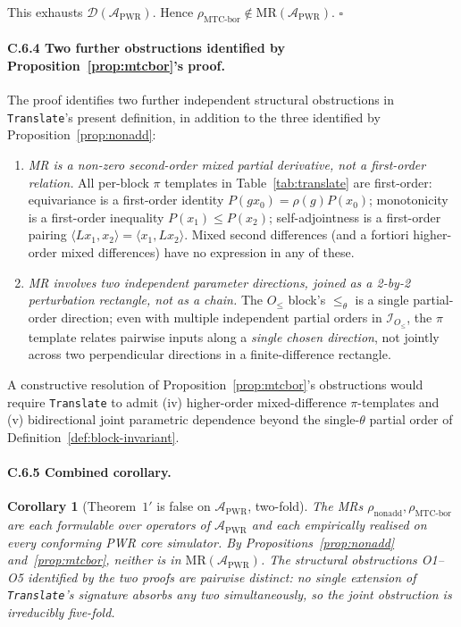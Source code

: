 \documentclass[manuscript]{acmart}
\newtheorem*{corollary*}{Corollary}
\begin{document}
This exhausts $\mathcal{D}(\mathcal{A}_{\mathrm{PWR}})$. Hence $\rho_{\mathrm{MTC\text{-}bor}} \notin \mathrm{MR}(\mathcal{A}_{\mathrm{PWR}})$. \hfill$\square$

\paragraph{C.6.4 Two further obstructions identified by Proposition~\ref{prop:mtcbor}'s proof.}
The proof identifies two further independent structural obstructions in \texttt{Translate}'s present definition, in addition to the three identified by Proposition~\ref{prop:nonadd}:
\begin{enumerate}[leftmargin=*,nosep]
  \item[(O4)] \emph{MR is a non-zero second-order mixed partial derivative, not a first-order relation.} All per-block $\pi$ templates in Table~\ref{tab:translate} are first-order: equivariance is a first-order identity $P(g x_{0}) = \rho(g) P(x_{0})$; monotonicity is a first-order inequality $P(x_{1}) \le P(x_{2})$; self-adjointness is a first-order pairing $\langle L x_{1}, x_{2}\rangle = \langle x_{1}, L x_{2}\rangle$. Mixed second differences (and a fortiori higher-order mixed differences) have no expression in any of these.
  \item[(O5)] \emph{MR involves two independent parameter directions, joined as a 2-by-2 perturbation rectangle, not as a chain.} The $O_{\le}$ block's $\le_{\theta}$ is a single partial-order direction; even with multiple independent partial orders in $\mathcal{I}_{O_{\le}}$, the $\pi$ template relates pairwise inputs along a \emph{single chosen direction}, not jointly across two perpendicular directions in a finite-difference rectangle.
\end{enumerate}

A constructive resolution of Proposition~\ref{prop:mtcbor}'s obstructions would require \texttt{Translate} to admit (iv) higher-order mixed-difference $\pi$-templates and (v) bidirectional joint parametric dependence beyond the single-$\theta$ partial order of Definition~\ref{def:block-invariant}.

\paragraph{C.6.5 Combined corollary.}
\begin{corollary*}[Theorem~$1'$ is false on $\mathcal{A}_{\mathrm{PWR}}$, two-fold]
The MRs $\rho_{\mathrm{nonadd}}, \rho_{\mathrm{MTC\text{-}bor}}$ are each formulable over operators of $\mathcal{A}_{\mathrm{PWR}}$ and each empirically realised on every conforming PWR core simulator. By Propositions~\ref{prop:nonadd} and~\ref{prop:mtcbor}, neither is in $\mathrm{MR}(\mathcal{A}_{\mathrm{PWR}})$. The structural obstructions O1--O5 identified by the two proofs are pairwise distinct: no single extension of \texttt{Translate}'s signature absorbs any two simultaneously, so the joint obstruction is irreducibly five-fold.
\end{corollary*}
\end{document}
